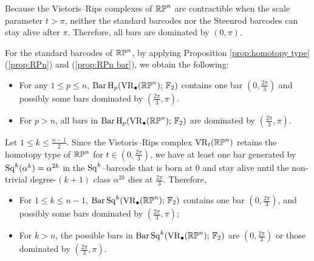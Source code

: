 \subsubsection{} Because the Vietoris--Rips complexes of $\mathbb{RP}^n$ are contractible when the scale parameter $t>\pi$, neither the standard barcodes nor the Steenrod barcodes can stay alive after $\pi$.
Therefore, all bars are dominated by $(0,\pi)$.

For the standard barcodes of $\mathbb{RP}^n$, by applying Proposition \ref{prop:homotopy type} (\ref{prop:RPn}) and (\ref{prop:RPn bar}), %
we obtain the following:
\begin{itemize}
	\item For any $1 \leq p \leq n$, $\operatorname{Bar} \operatorname{H}_{p}(\operatorname{VR}_\bullet(\mathbb{RP}^n);\,{\mathbb{F}_2})$ contains one bar $(0,\frac{2\pi}{3})$ and possibly some bars dominated by $(\frac{2\pi}{3}, \pi)$.
	\item For $p>n$, all bars in $\operatorname{Bar} \operatorname{H}_{p}(\operatorname{VR}_\bullet(\mathbb{RP}^n);\,{\mathbb{F}_2})$ are dominated by $(\frac{2\pi}{3},\pi)$.
\end{itemize}


Let $1 \leq k \leq \frac{n-1}{2}$.
Since the Vietoris--Rips complex $\operatorname{VR}_t(\mathbb{RP}^n)$ retains the homotopy type of $\mathbb{RP}^n$ for $t \in (0,\frac{2\pi}{3})$, we have at least one bar generated by $\operatorname{Sq}^k(\alpha^k)=\alpha^{2k}$ in the $\operatorname{Sq}^k$--barcode that is born at $0$ and stay alive until the non-trivial degree-$(k+1)$ class $\alpha^{2k}$ dies at $\frac{2\pi}{3}$.
Therefore,
\begin{itemize}
	\item For $1\leq k\leq n-1$, $\operatorname{Bar}\operatorname{Sq}^{k}(\operatorname{VR}_\bullet(\mathbb{RP}^n);\,{\mathbb{F}_2})$ contains one bar $(0,\frac{2\pi}{3})$, and possibly some bars dominated by $(\frac{2\pi}{3},\pi)$;
	\item For $k>n$, the possible bars in $\operatorname{Bar}\operatorname{Sq}^{k}(\operatorname{VR}_\bullet(\mathbb{RP}^n);\,{\mathbb{F}_2})$ are $(0,\frac{2\pi}{3})$ or those dominated by $(\frac{2\pi}{3},\pi)$.
\end{itemize}

